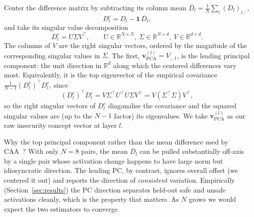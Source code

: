 \documentclass[11pt,a4paper]{article}
\newcommand{\vpca}{\mathbf{v}_{\text{PCA}}}
\newcommand{\R}{\mathbb{R}}
\begin{document}
Center the difference matrix by subtracting its column mean $\overline{D_l} = \frac{1}{N}\sum_i (D_l)_{i,:}$,
\begin{equation}
D_l^{c} = D_l - \mathbf{1}\,\overline{D_l},
\end{equation}
and take its singular value decomposition
\begin{equation}
D_l^{c} = U \Sigma V^{\top}, \qquad U \in \R^{N\times N},\ \Sigma \in \R^{N\times d},\ V \in \R^{d\times d}.
\end{equation}
The columns of $V$ are the right singular vectors, ordered by the magnitude of the corresponding singular values in $\Sigma$. The first, $\vpca^{(l)} = V_{:,1}$, is the leading principal component: the unit direction in $\R^d$ along which the centered differences vary most. Equivalently, it is the top eigenvector of the empirical covariance $\frac{1}{N-1} (D_l^c)^{\top} D_l^c$, since
\begin{equation}
(D_l^c)^{\top} D_l^c = V \Sigma^{\top} U^{\top} U \Sigma V^{\top} = V (\Sigma^{\top}\Sigma) V^{\top},
\end{equation}
so the right singular vectors of $D_l^c$ diagonalise the covariance and the squared singular values are (up to the $N{-}1$ factor) its eigenvalues. We take $\vpca^{(l)}$ as our raw insecurity concept vector at layer $l$.

Why the top principal component rather than the mean difference used by CAA~\cite{rimsky2024caa}? With only $N=8$ pairs, the mean $\overline{D_l}$ can be pulled substantially off-axis by a single pair whose activation change happens to have large norm but idiosyncratic direction. The leading PC, by contrast, ignores overall offset (we centered it out) and reports the direction of \emph{consistent} variation. Empirically (Section~\ref{sec:results}) the PC direction separates held-out safe and unsafe activations cleanly, which is the property that matters. As $N$ grows we would expect the two estimators to converge.
\end{document}
